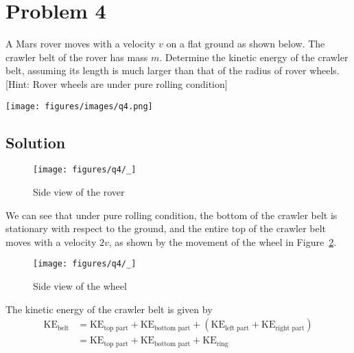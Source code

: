 \section*{Problem 4}

A Mars rover moves with a velocity \(v\) on a flat ground as shown below.
The crawler belt of the rover has mass \(m\).
Determine the kinetic energy of the crawler belt, assuming its length is much larger than that of the radius of rover wheels. [Hint: Rover wheels are under pure rolling condition]

\begin{figure*}[h]
    \centering
    \texttt{[image: figures/images/q4.png]}
\end{figure*}

\subsection*{Solution}

\begin{figure}[htb]
    \centering
    \texttt{[image: figures/q4/\_]}
    \caption{
        Side view of the rover
    }\label{fig:q4-belt}
\end{figure}

We can see that under pure rolling condition, the bottom of the crawler belt is stationary with respect to the ground, and the entire top of the crawler belt moves with a velocity \(2v\), as shown by the movement of the wheel in Figure~\ref{fig:q4-wheel}.

\begin{figure}[htb]
    \centering
    \texttt{[image: figures/q4/\_]}
    \caption{
        Side view of the wheel
    }\label{fig:q4-wheel}
\end{figure}

The kinetic energy of the crawler belt is given by
\begin{align*}
    \text{KE}_{\text{belt}}
     & =
    \text{KE}_{\text{top part}}
    + \text{KE}_{\text{bottom part}}
    + (\text{KE}_{\text{left part}}
    + \text{KE}_{\text{right part}})
    \\ & =
    \text{KE}_{\text{top part}}
    + \text{KE}_{\text{bottom part}}
    + \text{KE}_{\text{ring}}
    \tag{4.1}
\end{align*}

